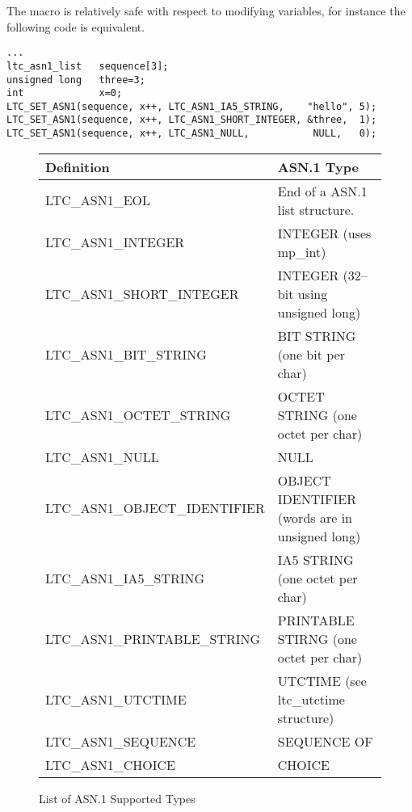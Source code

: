 \documentclass[a4paper]{book}
\begin{document}
The macro is relatively safe with respect to modifying variables, for instance the following code is equivalent.

\begin{small}
\begin{verbatim}
...
ltc_asn1_list   sequence[3];
unsigned long   three=3;
int             x=0;
LTC_SET_ASN1(sequence, x++, LTC_ASN1_IA5_STRING,    "hello", 5);
LTC_SET_ASN1(sequence, x++, LTC_ASN1_SHORT_INTEGER, &three,  1);
LTC_SET_ASN1(sequence, x++, LTC_ASN1_NULL,           NULL,   0);
\end{verbatim}
\end{small}

\begin{figure}[here]
\begin{center}
\begin{small}
\begin{tabular}{|l|l|}
\hline \textbf{Definition}           & \textbf{ASN.1 Type} \\
\hline LTC\_ASN1\_EOL                & End of a ASN.1 list structure. \\
\hline LTC\_ASN1\_INTEGER            & INTEGER (uses mp\_int) \\
\hline LTC\_ASN1\_SHORT\_INTEGER     & INTEGER (32--bit using unsigned long) \\
\hline LTC\_ASN1\_BIT\_STRING        & BIT STRING (one bit per char) \\
\hline LTC\_ASN1\_OCTET\_STRING      & OCTET STRING (one octet per char) \\
\hline LTC\_ASN1\_NULL               & NULL \\
\hline LTC\_ASN1\_OBJECT\_IDENTIFIER & OBJECT IDENTIFIER (words are in unsigned long) \\
\hline LTC\_ASN1\_IA5\_STRING        & IA5 STRING (one octet per char) \\
\hline LTC\_ASN1\_PRINTABLE\_STRING  & PRINTABLE STIRNG (one octet per char) \\
\hline LTC\_ASN1\_UTCTIME            & UTCTIME (see ltc\_utctime structure) \\
\hline LTC\_ASN1\_SEQUENCE           & SEQUENCE OF \\
\hline LTC\_ASN1\_CHOICE             & CHOICE \\
\hline
\end{tabular}
\caption{List of ASN.1 Supported Types}
\end{small}
\end{center}
\end{figure}
\end{document}

